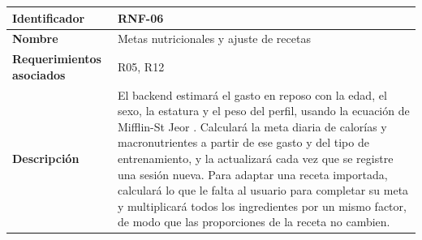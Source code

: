 \begin{table}[h!]
    \centering
    \renewcommand{\arraystretch}{1.3}
    \begin{tabular}{|p{3.5cm}|p{11.5cm}|}
        \hline
        \rowcolor[HTML]{EFEFEF}
        \textbf{Identificador} & \textbf{RNF-06} \\ \hline
        \textbf{Nombre} & Metas nutricionales y ajuste de recetas \\ \hline
        \textbf{Requerimientos asociados} & R05, R12 \\ \hline
        \textbf{Descripción} & El backend estimará el gasto en reposo con la edad, el sexo, la estatura y el peso del perfil, usando la ecuación de Mifflin-St Jeor \citep{mifflin1990new}. Calculará la meta diaria de calorías y macronutrientes a partir de ese gasto y del tipo de entrenamiento, y la actualizará cada vez que se registre una sesión nueva. Para adaptar una receta importada, calculará lo que le falta al usuario para completar su meta y multiplicará todos los ingredientes por un mismo factor, de modo que las proporciones de la receta no cambien. \\ \hline
    \end{tabular}
\end{table}

